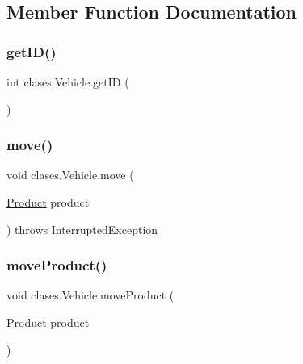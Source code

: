\subsection{Member Function Documentation}
\mbox{\label{classclases_1_1_vehicle_aff601a5fcf414d20838a594e6ed2d576}} 
\subsubsection{\texorpdfstring{get\+I\+D()}{getID()}}
{\footnotesize\ttfamily int clases.\+Vehicle.\+get\+ID (\begin{DoxyParamCaption}{ }\end{DoxyParamCaption})}

\mbox{\label{classclases_1_1_vehicle_aed30e6f35ff4a97ba674a512db100480}} 
\subsubsection{\texorpdfstring{move()}{move()}}
{\footnotesize\ttfamily void clases.\+Vehicle.\+move (\begin{DoxyParamCaption}\item[{\mbox{\hyperlink{classclases_1_1_product}{Product}}}]{product }\end{DoxyParamCaption}) throws Interrupted\+Exception}

\mbox{\label{classclases_1_1_vehicle_a1f34ee065a6e13bb1b2fbbf76f118b9b}} 
\subsubsection{\texorpdfstring{move\+Product()}{moveProduct()}}
{\footnotesize\ttfamily void clases.\+Vehicle.\+move\+Product (\begin{DoxyParamCaption}\item[{\mbox{\hyperlink{classclases_1_1_product}{Product}}}]{product }\end{DoxyParamCaption})}

